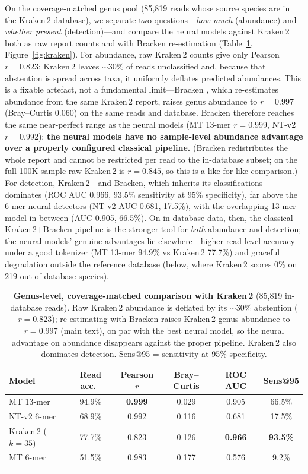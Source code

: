 On the coverage-matched genus pool (85{,}819 reads whose source species are in
the Kraken\,2 database), we separate two questions---\emph{how much} (abundance)
and \emph{whether present} (detection)---and compare the neural models against
Kraken\,2 both as raw report counts and with Bracken re-estimation
(Table~\ref{tab:kraken}, Figure~\ref{fig:kraken}). For abundance, raw Kraken\,2
counts give only Pearson $r=0.823$: Kraken\,2 leaves $\sim$30\% of reads
unclassified and, because that abstention is spread across taxa, it uniformly
deflates predicted abundances. This is a fixable artefact, not a fundamental
limit---Bracken \citep{Lu2017}, which re-estimates abundance from the same
Kraken\,2 report, raises genus abundance to $r=0.997$ (Bray--Curtis $0.060$) on
the same reads and database. Bracken therefore reaches the same near-perfect
range as the neural models (MT 13-mer $r=0.999$, NT-v2 $r=0.992$):
\textbf{the neural models have no sample-level abundance advantage over a
properly configured classical pipeline.} (Bracken redistributes the whole report and cannot be restricted per
read to the in-database subset; on the full 100K sample raw Kraken\,2 is
$r=0.845$, so this is a like-for-like comparison.) For detection, Kraken\,2---and
Bracken, which inherits its classifications---dominates (ROC AUC 0.966, 93.5\%
sensitivity at 95\% specificity), far above the 6-mer neural detectors (NT-v2
AUC 0.681, 17.5\%), with the overlapping-13-mer model in between (AUC 0.905,
66.5\%). On in-database data, then, the classical Kraken\,2$+$Bracken pipeline is
the stronger tool for \emph{both} abundance and detection; the neural models'
genuine advantages lie elsewhere---higher read-level accuracy under a good
tokenizer (MT 13-mer 94.9\% vs Kraken\,2 77.7\%) and graceful degradation
outside the reference database (below, where Kraken\,2 scores 0\% on 219
out-of-database species).

\begin{table}[t]
\centering
\caption{\textbf{Genus-level, coverage-matched comparison with Kraken\,2}
(85{,}819 in-database reads). Raw Kraken\,2 abundance is deflated by its
$\sim$30\% abstention ($r=0.823$); re-estimating with Bracken raises Kraken\,2
genus abundance to $r=0.997$ (main text), on par with the best neural model, so
the neural advantage on abundance disappears against the proper pipeline.
Kraken\,2 also dominates detection. Sens@95 = sensitivity at 95\% specificity.}
\label{tab:kraken}
\begin{tabular*}{\textwidth}{@{\extracolsep{\fill}}lccccc@{}}
\toprule
Model & Read acc.\ & Pearson $r$ & Bray--Curtis & ROC AUC & Sens@95 \\
\midrule
MT 13-mer            & 94.9\% & \textbf{0.999} & 0.029 & 0.905 & 66.5\% \\
NT-v2 6-mer          & 68.9\% & 0.992 & 0.116 & 0.681 & 17.5\% \\
Kraken\,2 ($k{=}35$) & 77.7\% & 0.823 & 0.126 & \textbf{0.966} & \textbf{93.5\%} \\
MT 6-mer             & 51.5\% & 0.983 & 0.177 & 0.576 & 9.2\% \\
\botrule
\end{tabular*}
\end{table}

